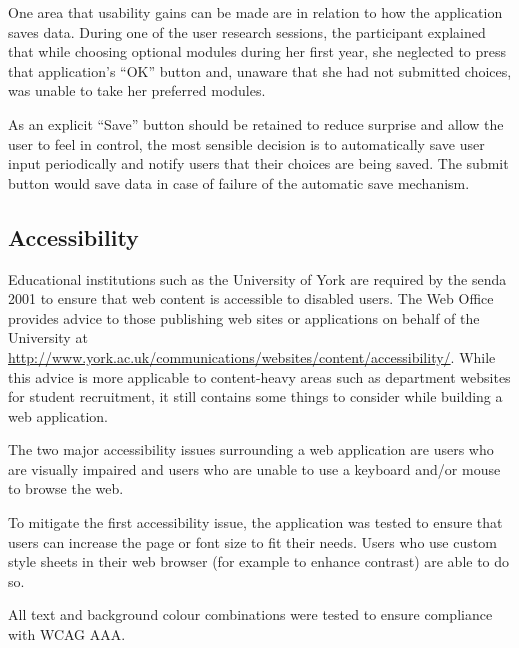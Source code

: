 \documentclass[draft]{scrartcl}
\begin{document}

One area that usability gains can be made are in relation to how the
application saves data. During one of the user research sessions, the
participant explained that while choosing optional modules during her first
year, she neglected to press that application's ``OK'' button and, unaware
that she had not submitted choices, was unable to take her preferred modules.

As an explicit ``Save'' button should be retained to reduce surprise and allow
the user to feel in control, the most sensible decision is to automatically
save user input periodically and notify users that their choices are being
saved. The submit button would save data in case of failure of the automatic
save mechanism.

\subsection{Accessibility}


Educational institutions such as the University of York are required by the
\gls{senda} 2001 to ensure that web content is accessible to disabled users.
The Web Office provides advice to those publishing web sites or applications
on behalf of the University at
\url{http://www.york.ac.uk/communications/websites/content/accessibility/}.
While this advice is more applicable to content-heavy areas such as department
websites for student recruitment, it still contains some things to consider
while building a web application.


The two major accessibility issues surrounding a web application are users who
are visually impaired and users who are unable to use a keyboard and/or mouse
to browse the web.

To mitigate the first accessibility issue, the application was tested to
ensure that users can increase the page or font size to fit their needs. Users
who use custom style sheets in their web browser (for example to enhance
contrast) are able to do so.

All text and background colour combinations were tested to ensure compliance
with WCAG AAA.
\end{document}
